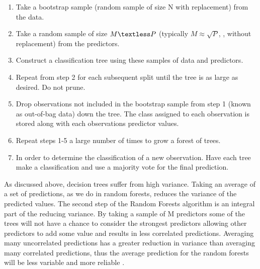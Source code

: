\documentclass[11pt,a4paper]{article}
\begin{document}
\begin{enumerate}
	\item Take a bootstrap sample (random sample of size N with replacement) from the data. 
	\item Take a random sample of size $M \textless P$ (typically $M \approx \sqrt{P}$, \cite{james13}, without replacement) from the predictors. 
	\item Construct a classification tree using these samples of data and predictors.
	\item Repeat from step 2 for each subsequent split until the tree is as large as desired. Do not prune. 
	\item Drop observations not included in the bootstrap sample from step 1 (known as out-of-bag data) down the tree. The class assigned to each observation is stored along with each observations predictor values.
	\item Repeat steps 1-5 a large number of times to grow a forest of trees. 
	\item In order to determine the classification of a new observation. Have each tree make a classification and use a majority vote for the final prediction.
\end{enumerate}

As discussed above, decision trees suffer from high variance. Taking an average of a set of predictions, as we do in random forests, reduces the variance of the predicted values. The second step of the Random Forests algorithm is an integral part of the reducing variance. By taking a sample of M predictors some of the trees will not have a chance to consider the strongest predictors allowing other predictors to add some value and results in less correlated predictions. Averaging many uncorrelated predictions has a greater reduction in variance than averaging many correlated predictions, thus the average prediction for the random forests will be less variable and more reliable \citep{james13}.
\end{document}
